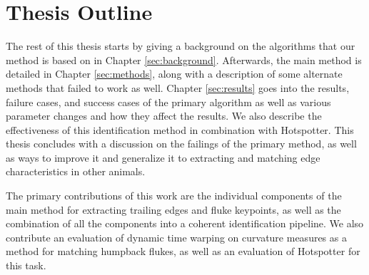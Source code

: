 \section{Thesis Outline}


The rest of this thesis starts by giving a background on the algorithms that our method is based on in Chapter \ref{sec:background}.
Afterwards, the main method is detailed in Chapter \ref{sec:methods}, along with a description of some alternate methods that failed to work as well.
Chapter \ref{sec:results} goes into the results, failure cases, and success cases of the primary algorithm as well as various parameter changes and how they affect the results.
We also describe the effectiveness of this identification method in combination with Hotspotter.
This thesis concludes with a discussion on the failings of the primary method, as well as ways to improve it and generalize it to extracting and matching edge characteristics in other animals.


The primary contributions of this work are the individual components of the main method for extracting trailing edges and fluke keypoints, as well as the combination of all the components into a coherent identification pipeline.
We also contribute an evaluation of dynamic time warping on curvature measures as a method for matching humpback flukes, as well as an evaluation of Hotspotter for this task.









